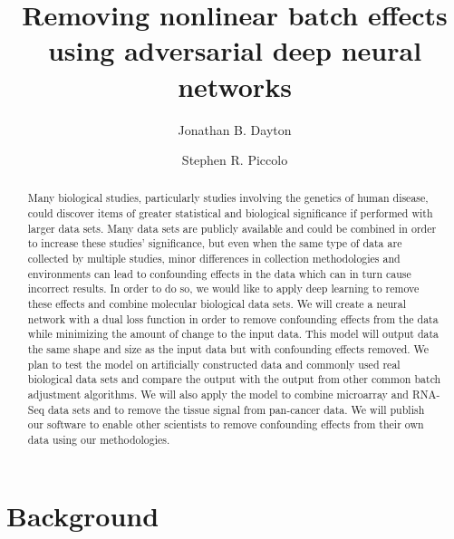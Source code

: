\documentclass[notitlepage]{article}
\begin{document}
\title{Removing nonlinear batch effects using adversarial deep neural networks}
\author[1]{Jonathan B. Dayton}
\author[1]{Stephen R. Piccolo}
\date{}

\maketitle

\begin{abstract}
	Many biological studies, particularly studies involving the genetics of human disease, could discover items of greater statistical and biological significance if performed with larger data sets.
	Many data sets are publicly available and could be combined in order to increase these studies' significance, but even when the same type of data are collected by multiple studies, minor differences in collection methodologies and environments can lead to confounding effects in the data which can in turn cause incorrect results.
	In order to do so, we would like to apply deep learning to remove these effects and combine molecular biological data sets.
	We will create a neural network with a dual loss function in order to remove confounding effects from the data while minimizing the amount of change to the input data.
	This model will output data the same shape and size as the input data but with confounding effects removed.
	We plan to test the model on artificially constructed data and commonly used real biological data sets and compare the output with the output from other common batch adjustment algorithms.
	We will also apply the model to combine microarray and RNA-Seq data sets and to remove the tissue signal from pan-cancer data.
	We will publish our software to enable other scientists to remove confounding effects from their own data using our methodologies.
\end{abstract}

\section{Background} \label{sec:background}
\end{document}
